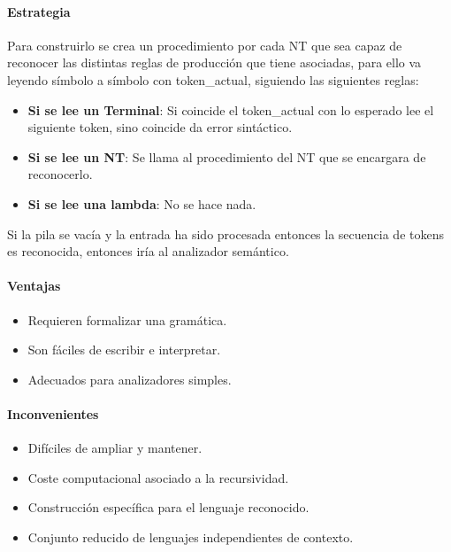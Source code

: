 \documentclass[12pt]{report} %
\begin{document}
\paragraph{Estrategia}

Para construirlo se crea un procedimiento por cada NT que sea capaz de
reconocer las distintas reglas de producción que tiene asociadas, para
ello va leyendo símbolo a símbolo con token\_actual, siguiendo las
siguientes reglas:

\begin{itemize}

\item
\textbf{Si se lee un Terminal}: Si coincide el token\_actual con lo esperado
  lee el siguiente token, sino coincide da error sintáctico.
\item
\textbf{Si se lee un NT}: Se llama al procedimiento del NT que se encargara de
  reconocerlo.
\item
\textbf{Si se lee una lambda}: No se hace nada.
\end{itemize}

Si la pila se vacía y la entrada ha sido procesada entonces la secuencia
de tokens es reconocida, entonces iría al analizador semántico.


\paragraph{Ventajas}

\begin{itemize}

\item
  Requieren formalizar una gramática.
\item
  Son fáciles de escribir e interpretar.
\item
  Adecuados para analizadores simples.
\end{itemize}


\paragraph{Inconvenientes}

\begin{itemize}

\item
  Difíciles de ampliar y mantener.
\item
  Coste computacional asociado a la recursividad.
\item
  Construcción específica para el lenguaje reconocido.
\item
  Conjunto reducido de lenguajes independientes de contexto.
\end{itemize}
 
\end{document}
